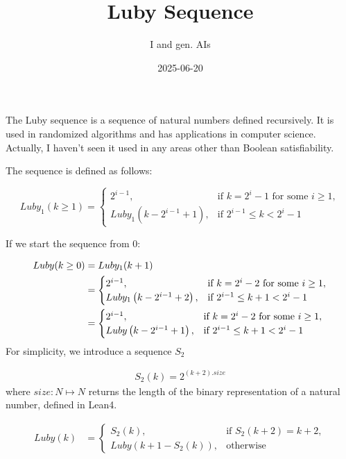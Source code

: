 \documentclass{article}
\title{Luby Sequence}
\author{I and gen. AIs}
\date{2025-06-20}
\begin{document}
\maketitle

The Luby sequence is a sequence of natural numbers defined recursively.
It is used in randomized algorithms and has applications in computer science.
Actually, I haven’t seen it used in any areas other than Boolean satisfiability.

The sequence is defined as follows:

\begin{equation}
Luby_1(k \ge 1) =
\begin{cases}
2^{i-1}, & \text{if } k = 2^i - 1 \text{ for some } i \geq 1, \\
Luby_1\left(k - 2^{i-1} + 1\right), & \text{if } 2^{i-1} \leq k < 2^i - 1
\end{cases}
\end{equation}


If we start the sequence from 0:

\begin{align}
Luby(k \ge 0) &= Luby_1(k+1) \notag\\
&=
\begin{cases}
2^{i-1}, & \text{if } k = 2^i -2 \text{ for some } i \geq 1, \\
Luby_1\left(k - 2^{i-1} + 2\right), & \text{if } 2^{i-1} \leq k + 1 < 2^i - 1
\end{cases}\notag\\
&=
\begin{cases}
2^{i-1}, & \text{if } k = 2^i -2 \text{ for some } i \geq 1, \\
Luby\left(k - 2^{i-1} + 1\right), & \text{if } 2^{i-1} \leq k + 1 < 2^i - 1
\end{cases}
\end{align}
For simplicity, we introduce a sequence $S_2$

\begin{align}
	S_2 (k) = 2^{(k + 2).size}
\end{align}
where $size : N \longmapsto N $ returns the length of the binary representation of a natural number, defined in Lean4.

\begin{align}
Luby(k)
&=
\begin{cases}
S_2(k), & \text{if } S_2(k+2) = k+2, \\
Luby\left(k + 1 - S_2(k)\right), & \text{otherwise}
\end{cases}
\end{align}
\end{document}
